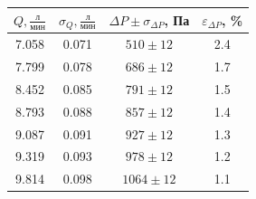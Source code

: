 \documentclass[a4paper]{article}
\begin{document}
\begin{enumerate}
\begin{multicols}{2}
\vspace{1em}
\begin{center}
    \begin{tabular}{|c|c|c|c|}
        \hline
        $Q, \frac{\text{л}}{\text{мин}}$ & $\sigma_Q, \frac{\text{л}}{\text{мин}}$ & $\Delta P \pm \sigma_{\Delta P}$, Па & $\varepsilon_{\Delta P}$, \% \\
        \hline
        7.058 & 0.071 & $510 \pm 12$ & 2.4 \\ \hline
        7.799 & 0.078 & $686 \pm 12$ & 1.7 \\ \hline
        8.452 & 0.085 & $791 \pm 12$ & 1.5 \\ \hline
        8.793 & 0.088 & $857 \pm 12$ & 1.4 \\ \hline
        9.087 & 0.091 & $927 \pm 12$ & 1.3 \\ \hline
        9.319 & 0.093 & $978 \pm 12$ & 1.2 \\ \hline
        9.814 & 0.098 & $1064 \pm 12$ & 1.1 \\ \hline
    \end{tabular}
\end{center}



\end{multicols}
\end{enumerate}
\end{document}
